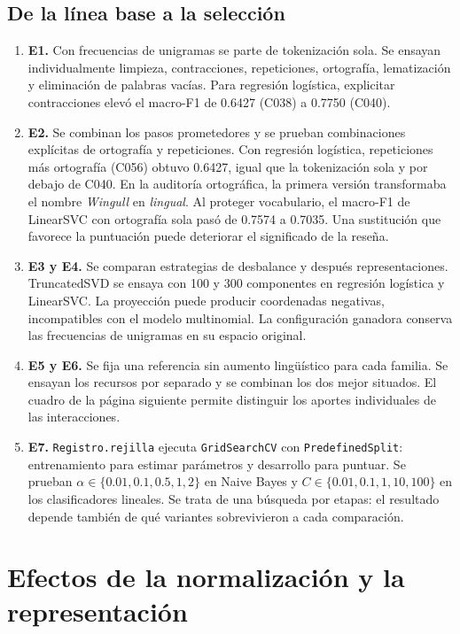 \documentclass[11pt,letterpaper]{article}
\begin{document}
\subsection*{De la línea base a la selección}
\begin{enumerate}
\item \textbf{E1.} Con frecuencias de unigramas se parte de tokenización sola. Se ensayan individualmente limpieza, contracciones, repeticiones, ortografía, lematización y eliminación de palabras vacías. Para regresión logística, explicitar contracciones elevó el macro-F1 de 0.6427 (C038) a 0.7750 (C040).
\item \textbf{E2.} Se combinan los pasos prometedores y se prueban combinaciones explícitas de ortografía y repeticiones. Con regresión logística, repeticiones más ortografía (C056) obtuvo 0.6427, igual que la tokenización sola y por debajo de C040. En la auditoría ortográfica, la primera versión transformaba el nombre \textit{Wingull} en \textit{lingual}. Al proteger vocabulario, el macro-F1 de LinearSVC con ortografía sola pasó de 0.7574 a 0.7035. Una sustitución que favorece la puntuación puede deteriorar el significado de la reseña.
\item \textbf{E3 y E4.} Se comparan estrategias de desbalance y después representaciones. TruncatedSVD se ensaya con 100 y 300 componentes en regresión logística y LinearSVC. La proyección puede producir coordenadas negativas, incompatibles con el modelo multinomial. La configuración ganadora conserva las frecuencias de unigramas en su espacio original.
\item \textbf{E5 y E6.} Se fija una referencia sin aumento lingüístico para cada familia. Se ensayan los recursos por separado y se combinan los dos mejor situados. El cuadro de la página siguiente permite distinguir los aportes individuales de las interacciones.
\item \textbf{E7.} \texttt{Registro.rejilla} ejecuta \texttt{GridSearchCV} con \texttt{PredefinedSplit}: entrenamiento para estimar parámetros y desarrollo para puntuar. Se prueban $\alpha\in\{0.01,0.1,0.5,1,2\}$ en Naive Bayes y $C\in\{0.01,0.1,1,10,100\}$ en los clasificadores lineales. Se trata de una búsqueda por etapas: el resultado depende también de qué variantes sobrevivieron a cada comparación.
\end{enumerate}

\newpage
\section{Efectos de la normalización y la representación}
\end{document}
